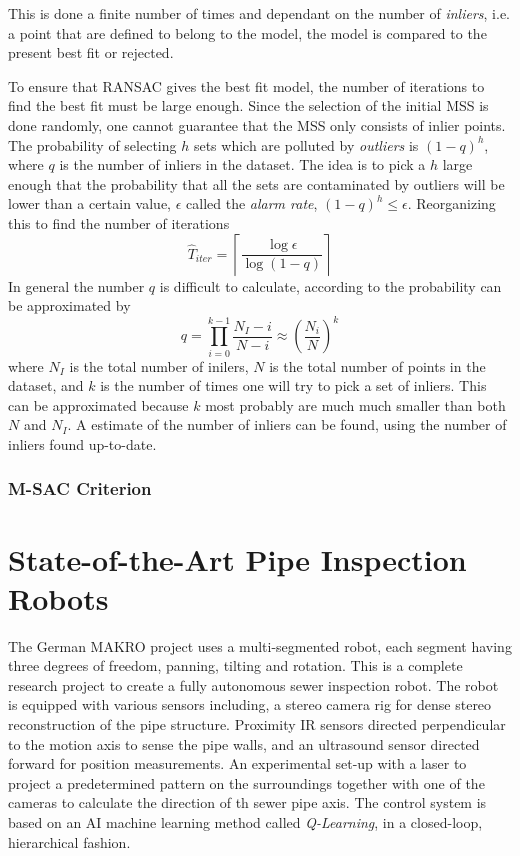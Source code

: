 This is done a finite number of times and dependant on the number of \emph{inliers}, i.e.
a point that are defined to belong to the model, the model is compared to the present best
fit or rejected.

To ensure that RANSAC gives the best fit model, the number of iterations to find the best
fit must be large enough. Since the selection of the initial MSS is done randomly, one
cannot guarantee that the MSS only consists of inlier points. The probability of
selecting $h$ sets which are polluted by \emph{outliers} is $(1 - q)^h$, where $q$ is the
number of inliers in the dataset. The idea is to pick a $h$ large enough that the
probability that all the sets are contaminated by outliers will be lower than a certain
value, $\epsilon$ called the \emph{alarm rate}, $(1 - q)^h \leq \epsilon$. Reorganizing
this to find the number of iterations
\begin{equation}
    \hat{T}_{iter} = \left \lceil \frac{\log \epsilon}{\log (1 - q)} \right\rceil
\end{equation}
In general the number $q$ is difficult to calculate, according to \cite{ransac-dummies}
the probability can be approximated by 
\begin{equation}
    q = \prod_{i = 0}^{k-1} \frac{N_I - i}{N - i} \approx \left ( \frac{N_i}{N} \right)^k
\end{equation}
where $N_I$ is the total number of inilers, $N$ is the total number of points in the
dataset, and $k$ is the number of times one will try to pick a set of inliers. This can be
approximated because $k$ most probably are much much smaller than both $N$ and $N_I$. A
estimate of the number of inliers can be found, using the number of inliers found
up-to-date. \cite{ransac-dummies}


\subsubsection{M-SAC Criterion}



\section{State-of-the-Art Pipe Inspection Robots}
\label{chap2:sec-state-of-the-art}
The German MAKRO project \cite{MAKRO-project} uses a multi-segmented robot, each segment 
having three degrees of freedom, panning, tilting and rotation. This is a complete
research project to create a fully autonomous sewer inspection robot. The robot is
equipped with various sensors including, a stereo camera rig for dense stereo
reconstruction of the pipe structure. Proximity IR sensors directed perpendicular to the
motion axis to sense the pipe walls, and an ultrasound sensor directed forward for
position measurements. An experimental set-up with a laser to project a predetermined
pattern on the surroundings together with one of the cameras to calculate the direction of
th sewer pipe axis. The control system is based on an AI machine learning method called \emph{Q-Learning}, in
a closed-loop, hierarchical fashion.


